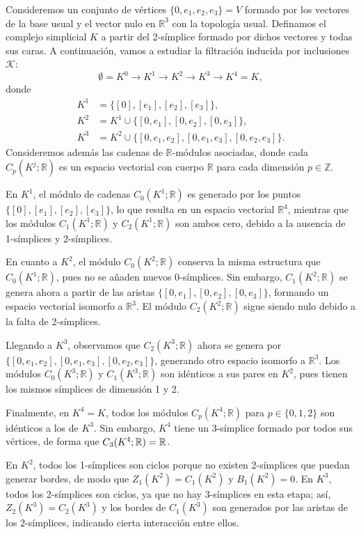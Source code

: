 \begin{ejemplo}
	\label{ex:pers-homology}
	Consideremos un conjunto de vértices $\{0, e_1, e_2, e_3\} = V$ formado por los vectores de la base usual y el vector nulo en $\mathbb{R}^3$ con la topología usual. Definamos el complejo simplicial $K$ a partir del 2-símplice formado por dichos vectores y todas sus caras. A continuación, vamos a estudiar la filtración inducida por inclusiones $\mathcal{K}$:
	\[
	\emptyset = K^0 \to K^1 \to K^2 \to K^3 \to K^4 = K,
	\]
	donde 
	\begin{align*}
		K^1 &= \{[0], [e_1], [e_2], [e_3]\}, \\
		K^2 &= K^1 \cup \{[0, e_1], [0, e_2], [0, e_3]\}, \\
		K^3 &= K^2 \cup \{[0, e_1, e_2], [0, e_1, e_3], [0, e_2, e_3]\}.
	\end{align*}
	Consideremos además las cadenas de $\mathbb{R}$-módulos asociadas, donde cada $C_p(K^j;\mathbb{R})$ es un espacio vectorial con cuerpo $\mathbb{R}$ para cada dimensión $p \in \mathbb{Z}$.
	
	En $K^1$, el módulo de cadenas $C_0(K^1; \mathbb{R})$ es generado por los puntos $\{ [0], [e_1], [e_2], [e_3] \}$, lo que resulta en un espacio vectorial $\mathbb{R}^4$, mientras que los módulos $C_1(K^1; \mathbb{R})$ y $C_2(K^1; \mathbb{R})$ son ambos cero, debido a la ausencia de 1-símplices y 2-símplices.
	
	En cuanto a $K^2$, el módulo $C_0(K^2; \mathbb{R})$ conserva la misma estructura que $C_0(K^1; \mathbb{R})$, pues no se añaden nuevos 0-símplices. Sin embargo, $C_1(K^2; \mathbb{R})$ se genera ahora a partir de las aristas $\{ [0, e_1], [0, e_2], [0, e_3] \}$, formando un espacio vectorial isomorfo a $\mathbb{R}^3$. El módulo $C_2(K^2; \mathbb{R})$ sigue siendo nulo debido a la falta de 2-símplices.
	
	Llegando a $K^3$, observamos que $C_2(K^3; \mathbb{R})$ ahora se genera por $\{ [0, e_1, e_2], [0, e_1, e_3], [0, e_2, e_3] \}$, generando otro espacio isomorfo a $\mathbb{R}^3$. Los módulos $C_0(K^3; \mathbb{R})$ y $C_1(K^3; \mathbb{R})$ son idénticos a sus pares en $K^2$, pues tienen los mismos símplices de dimensión 1 y 2.
	
	Finalmente, en $K^4 = K$, todos los módulos $C_p(K^4; \mathbb{R})$ para $p \in \{ 0, 1, 2 \}$ son idénticos a los de $K^3$. Sin embargo, $K^4$ tiene un 3-símplice formado por todos sus vértices, de forma que $C_3(K^4; \mathbb{R}) = \mathbb{R}$.
	
	En $K^2$, todos los 1-símplices son ciclos porque no existen 2-símplices que puedan generar bordes, de modo que $Z_1(K^2) = C_1(K^2)$ y $B_1(K^2) = 0$. En $K^3$, todos los 2-símplices son ciclos, ya que no hay 3-símplices en esta etapa; así, $Z_2(K^3) = C_2(K^3)$ y los bordes de $C_1(K^3)$ son generados por las aristas de los 2-símplices, indicando cierta interacción entre ellos.
	

\end{ejemplo}
